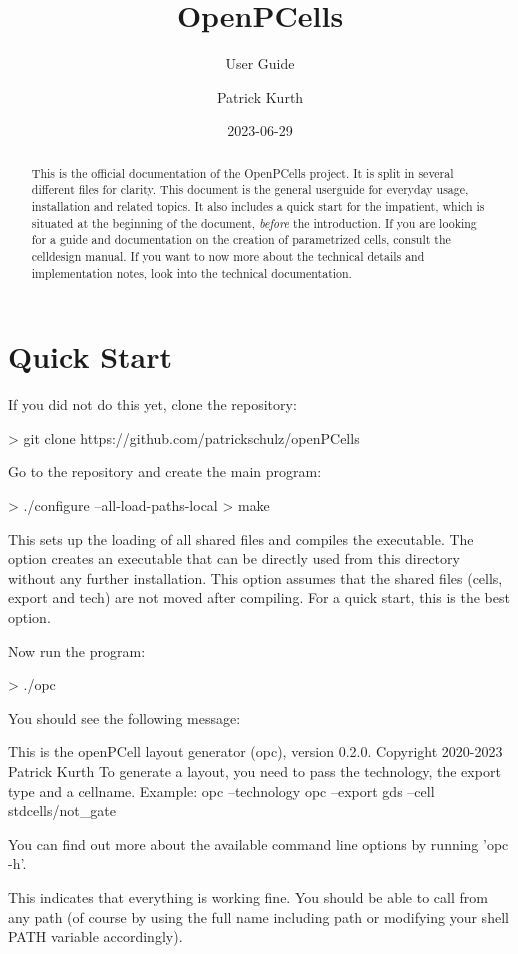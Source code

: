 

\title{OpenPCells}
\subtitle{User Guide}
\author{Patrick Kurth}
\date{2023-06-29}



\maketitle
\begin{abstract}
    \noindent This is the official documentation of the OpenPCells project.
    It is split in several different files for clarity. 
    This document is the general userguide for everyday usage, installation and related topics.
    It also includes a quick start for the impatient, which is situated at the beginning of the document, \emph{before} the introduction.
    If you are looking for a guide and documentation on the creation of parametrized cells, consult the celldesign manual.
    If you want to now more about the technical details and implementation notes, look into the technical documentation.
\end{abstract}

\tableofcontents

\section{Quick Start}
If you did not do this yet, clone the repository:
\begin{shellcode}
    > git clone https://github.com/patrickschulz/openPCells
\end{shellcode}
Go to the repository and create the main program:
\begin{shellcode}
    > ./configure --all-load-paths-local
    > make
\end{shellcode}
This sets up the loading of all shared files and compiles the executable.
The option  creates an executable that can be directly used from this directory without any further installation.
This option assumes that the shared files (cells, export and tech) are not moved after compiling.
For a quick start, this is the best option.

Now run the program:
\begin{shellcode}
    > ./opc
\end{shellcode}
You should see the following message:
\begin{shellcode}
    This is the openPCell layout generator (opc), version 0.2.0.
    Copyright 2020-2023 Patrick Kurth
    To generate a layout, you need to pass the technology, the export type and a cellname.
    Example:
             opc --technology opc --export gds --cell stdcells/not_gate

    You can find out more about the available command line options by running 'opc -h'.
\end{shellcode}
This indicates that everything is working fine.
You should be able to call  from any path (of course by using the full name including path or modifying your shell PATH variable accordingly).


